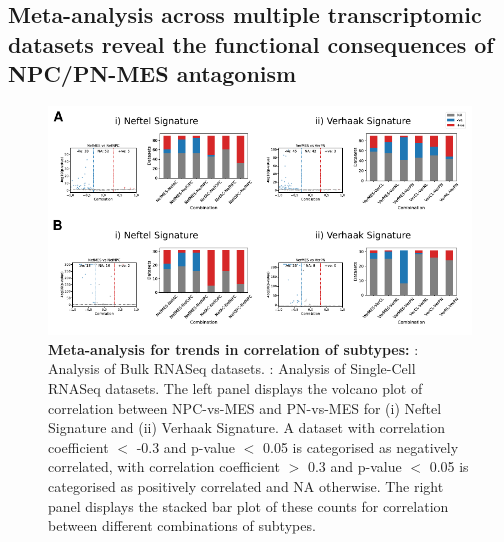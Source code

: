 \documentclass[11pt,a4paper]{article}
\begin{document}
\subsection{Meta-analysis across multiple transcriptomic datasets reveal the functional consequences of NPC/PN-MES antagonism}
\begin{figure}[h!]
    \begin{subfigure}[c]{\textwidth}
        \label{bulkmetanal}
    \end{subfigure}
    \begin{subfigure}[c]{\textwidth}
        \label{scmetanal}
    \end{subfigure}
    \centering
    \includegraphics[width=\textwidth]{Figure4}
    \caption{\textbf{Meta-analysis for trends in correlation of subtypes:} : Analysis of Bulk RNASeq datasets. : Analysis of Single-Cell RNASeq datasets. The left panel displays the volcano plot of correlation between NPC-vs-MES and PN-vs-MES for (i) Neftel Signature and (ii) Verhaak Signature. A dataset with correlation coefficient $<$ -0.3 and p-value $<$ 0.05 is categorised as negatively correlated, with correlation coefficient $>$ 0.3 and p-value $<$ 0.05 is categorised as positively correlated and NA otherwise. The right panel displays the stacked bar plot of these counts for correlation between different combinations of subtypes.}
    \label{metanal}
\end{figure}
\end{document}
